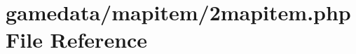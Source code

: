 \hypertarget{2mapitem_8php}{\section{gamedata/mapitem/2mapitem.php File Reference}
\label{2mapitem_8php}
}

